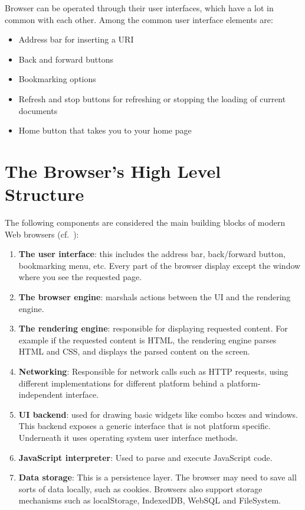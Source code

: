 \documentclass[a4paper, justified, notoc]{tufte-handout} %
\begin{document}
Browser can be operated through their user interfaces, which have a lot in common with each other. Among the common user interface elements are:
\begin{itemize}
	\item Address bar for inserting a URI
	\item Back and forward buttons
	\item Bookmarking options
	\item Refresh and stop buttons for refreshing or stopping the loading of current documents
	\item Home button that takes you to your home page
\end{itemize}



\section{The Browser's High Level Structure} %
\label{sub:the_browser_s_high_level_structure}

The following components are considered the main building blocks of modern Web browsers (cf.~\citep{grosskurth:2006}):
\begin{enumerate}
	\item \textbf{The user interface}: this includes the address bar, back/forward button, bookmarking menu, etc. Every part of the browser display except the window where you see the requested page.
	\item \textbf{The browser engine}: marshals actions between the UI and the rendering engine.
	\item \textbf{The rendering engine}: responsible for displaying requested content. For example if the requested content is HTML, the rendering engine parses HTML and CSS, and displays the parsed content on the screen.
	\item \textbf{Networking}: Responsible for network calls such as HTTP requests, using different implementations for different platform behind a platform-independent interface.
	\item \textbf{UI backend}: used for drawing basic widgets like combo boxes and windows. This backend exposes a generic interface that is not platform specific. Underneath it uses operating system user interface methods.
	\item \textbf{JavaScript interpreter}: Used to parse and execute JavaScript code.
	\item \textbf{Data storage}: This is a persistence layer. The browser may need to save all sorts of data locally, such as cookies. Browsers also support storage mechanisms such as localStorage, IndexedDB, WebSQL and FileSystem.
\end{enumerate}
\end{document}
